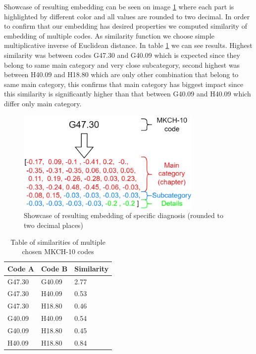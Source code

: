 Showcase of resulting embedding can be seen on image \ref{fig:diag_emb_show} where each part is highlighted by different color and all values are rounded to two decimal.
In order to confirm that our embedding has desired properties we computed similarity of embedding of multiple codes. As similarity function we choose simple multiplicative inverse of Euclidean distance. In table \ref{tab:diag_emb_show} we can see results. Highest similarity was between codes G47.30 and G40.09 which is expected since they belong to same main category and very close subcategory, second highest was between H40.09 and H18.80 which are only other combination that belong to same main category, this confirms that main category has biggest impact since this similarity is significantly higher than that between G40.09 and H40.09 which differ only main category.

\begin{figure}[!h]
	\centering
	
	\includegraphics[width=0.8\textwidth]{images/diagnosis_embed_showcase.png}
	
	\caption{Showcase of resulting embedding of specific diagnosis (rounded to two decimal places)}
	\label{fig:diag_emb_show}
\end{figure} 


\begin{table}[!h]
	\centering
	\begin{tabular}{|l|l|l|}
		\hline
		Code A & Code B & Similarity \\ \hline
		G47.30 & G40.09 & 2.77       \\ \hline
		G47.30 & H40.09 & 0.53       \\ \hline
		G47.30 & H18.80 & 0.46       \\ \hline
		G40.09 & H40.09 & 0.54       \\ \hline
		G40.09 & H18.80 & 0.45       \\ \hline
		H40.09 & H18.80 & 0.84       \\ \hline
	\end{tabular}
	\caption{Table of similarities of multiple chosen MKCH-10 codes}
	\label{tab:diag_emb_show}
\end{table}  

